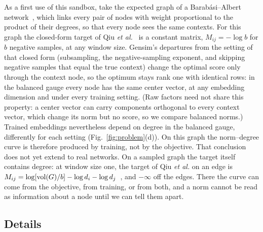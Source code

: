 \documentclass[aps,pre,reprint,superscriptaddress,longbibliography]{revtex4-2}
\begin{document}
As a first use of this sandbox, take the expected graph of a Barab\'asi--Albert network~\cite{barabasi1999emergence}, which links every pair of nodes with weight proportional to the product of their degrees, so that every node sees the same contexts.
For this graph the closed-form target of Qiu \textit{et al.}~\cite{qiu2018network} is a constant matrix, $M_{ij} = -\log b$ for $b$ negative samples, at any window size.
Gensim's departures from the setting of that closed form (subsampling, the negative-sampling exponent, and skipping negative samples that equal the true context) change the optimal score only through the context node, so the optimum stays rank one with identical rows: in the balanced gauge every node has the same center vector, at any embedding dimension and under every training setting. (Raw factors need not share this property: a center vector can carry components orthogonal to every context vector, which change its norm but no score, so we compare balanced norms.)
Trained embeddings nevertheless depend on degree in the balanced gauge, differently for each setting (Fig.~\ref{fig:problem}(d)).
On this graph the norm--degree curve is therefore produced by training, not by the objective.
That conclusion does not yet extend to real networks.
On a sampled graph the target itself contains degree: at window size one, the target of Qiu \textit{et al.} on an edge is $M_{ij} = \log[\operatorname{vol}(G)/b] - \log d_i - \log d_j$~\cite{qiu2018network}, and $-\infty$ off the edges.
There the curve can come from the objective, from training, or from both, and a norm cannot be read as information about a node until we can tell them apart.







\subsection{Details}%
\end{document}
